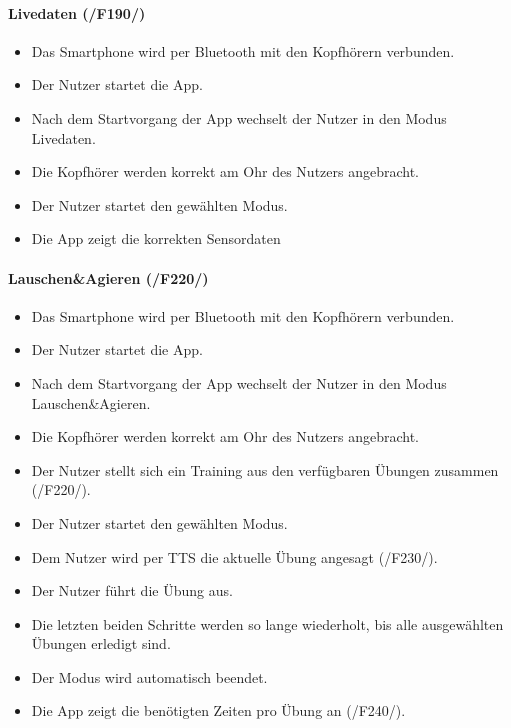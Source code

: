 \documentclass[a4paper,12pt]{article}
\begin{document}
      \paragraph{Livedaten (/F190/)}
      \begin{itemize}
        \item[] Das Smartphone wird per Bluetooth mit den Kopfhörern verbunden.
        \item[] Der Nutzer startet die App.
        \item[] Nach dem Startvorgang der App wechselt der Nutzer in den Modus \glqq Livedaten\grqq .
        \item[] Die Kopfhörer werden korrekt am Ohr des Nutzers angebracht.
        \item[] Der Nutzer startet den gewählten Modus.
        \item[] Die App zeigt die korrekten Sensordaten 
      \end{itemize}

      \paragraph{Lauschen\&Agieren (/F220/)}
      \begin{itemize}
        \item[] Das Smartphone wird per Bluetooth mit den Kopfhörern verbunden.
        \item[] Der Nutzer startet die App.
        \item[] Nach dem Startvorgang der App wechselt der Nutzer in den Modus \glqq Lauschen\&Agieren\grqq .
        \item[] Die Kopfhörer werden korrekt am Ohr des Nutzers angebracht.
        \item[] Der Nutzer stellt sich ein Training aus den verfügbaren Übungen zusammen (/F220/).
        \item[] Der Nutzer startet den gewählten Modus.
        \item[] Dem Nutzer wird per \Gls{TTS} die aktuelle Übung angesagt (/F230/).
        \item[] Der Nutzer führt die Übung aus.
        \item[] Die letzten beiden Schritte werden so lange wiederholt, bis alle ausgewählten Übungen erledigt sind.
        \item[] Der Modus wird automatisch beendet.
        \item[] Die App zeigt die benötigten Zeiten pro Übung an (/F240/).
      \end{itemize}
\end{document}
